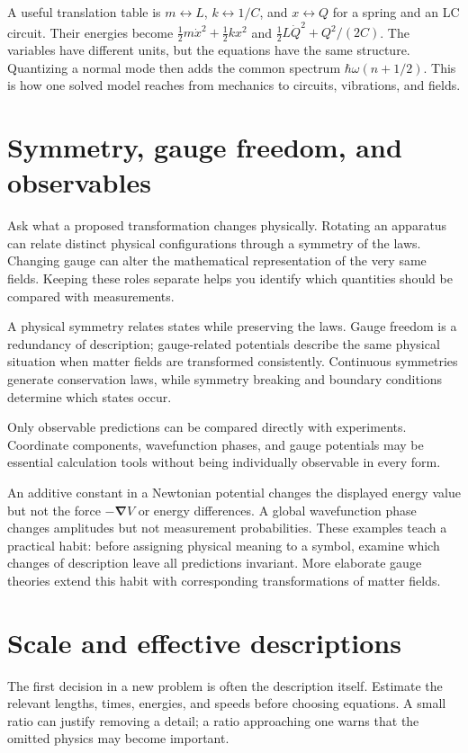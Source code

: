 \documentclass[11pt,oneside]{book}
\newcommand{\grad}{\boldsymbol{\nabla}}
\theoremstyle{reviewstyle}
\begin{document}
A useful translation table is $m\leftrightarrow L$, $k\leftrightarrow1/C$, and $x\leftrightarrow Q$ for a spring and an LC circuit. Their energies become $\tfrac12m\dot x^2+\tfrac12kx^2$ and $\tfrac12L\dot Q^2+Q^2/(2C)$. The variables have different units, but the equations have the same structure. Quantizing a normal mode then adds the common spectrum $\hbar\omega(n+1/2)$. This is how one solved model reaches from mechanics to circuits, vibrations, and fields.

\section{Symmetry, gauge freedom, and observables}
Ask what a proposed transformation changes physically. Rotating an apparatus can relate distinct physical configurations through a symmetry of the laws. Changing gauge can alter the mathematical representation of the very same fields. Keeping these roles separate helps you identify which quantities should be compared with measurements.

A physical symmetry relates states while preserving the laws. Gauge freedom is a redundancy of description; gauge-related potentials describe the same physical situation when matter fields are transformed consistently. Continuous symmetries generate conservation laws, while symmetry breaking and boundary conditions determine which states occur.

Only observable predictions can be compared directly with experiments. Coordinate components, wavefunction phases, and gauge potentials may be essential calculation tools without being individually observable in every form.

An additive constant in a Newtonian potential changes the displayed energy value but not the force $-\grad V$ or energy differences. A global wavefunction phase changes amplitudes but not measurement probabilities. These examples teach a practical habit: before assigning physical meaning to a symbol, examine which changes of description leave all predictions invariant. More elaborate gauge theories extend this habit with corresponding transformations of matter fields.

\section{Scale and effective descriptions}
The first decision in a new problem is often the description itself. Estimate the relevant lengths, times, energies, and speeds before choosing equations. A small ratio can justify removing a detail; a ratio approaching one warns that the omitted physics may become important.
\end{document}
